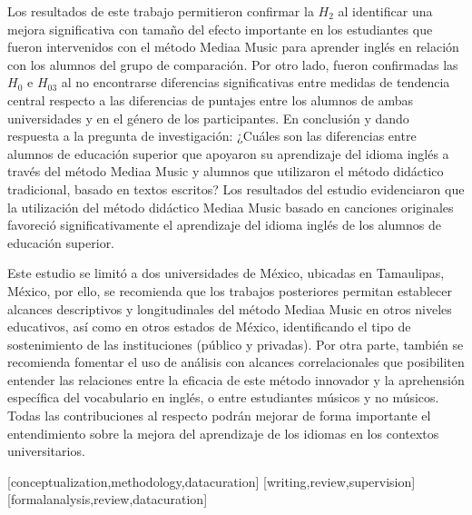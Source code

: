 \documentclass[spanish]{textolivre}
\begin{document}
Los resultados de este trabajo permitieron confirmar la $H_2$ al identificar una mejora significativa con tamaño del efecto importante en los estudiantes que fueron intervenidos con el método Mediaa Music para aprender inglés en relación con los alumnos del grupo de comparación. Por otro lado, fueron confirmadas las $H_0$ e $H_03$ al no encontrarse diferencias significativas entre medidas de tendencia central respecto a las diferencias de puntajes entre los alumnos de ambas universidades y en el género de los participantes. En conclusión y dando respuesta a la pregunta de investigación: ¿Cuáles son las diferencias entre alumnos de educación superior que apoyaron su aprendizaje del idioma inglés a través del método Mediaa Music y alumnos que utilizaron el método didáctico tradicional, basado en textos escritos? Los resultados del estudio evidenciaron que la utilización del método didáctico Mediaa Music basado en canciones originales favoreció significativamente el aprendizaje del idioma inglés de los alumnos de educación superior.

Este estudio se limitó a dos universidades de México, ubicadas en Tamaulipas, México, por ello, se recomienda que los trabajos posteriores permitan establecer alcances descriptivos y longitudinales del método Mediaa Music en otros niveles educativos, así como en otros estados de México, identificando el tipo de sostenimiento de las instituciones (público y privadas). Por otra parte, también se recomienda fomentar el uso de análisis con alcances correlacionales que posibiliten entender las relaciones entre la eficacia de este método innovador y la aprehensión específica del vocabulario en inglés, o entre estudiantes músicos y no músicos. Todas las contribuciones al respecto podrán mejorar de forma importante el entendimiento sobre la mejora del aprendizaje de los idiomas en los contextos universitarios.


\printbibliography\label{sec-bib}


\begin{contributors}
[conceptualization,methodology,datacuration]
[writing,review,supervision]
[formalanalysis,review,datacuration]
\end{contributors}
\end{document}
